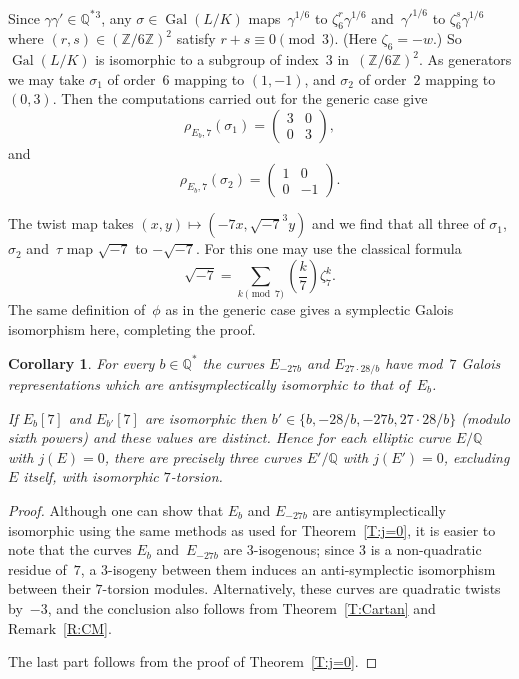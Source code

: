 \documentclass[12pt]{amsart}
\newcommand{\Q}{\mathbb{Q}}
\newcommand{\Z}{\mathbb{Z}}
\DeclareMathOperator{\Gal}{Gal}
\def\legendre#1#2{\left(\displaystyle\frac{#1}{#2}\right)}
\numberwithin{equation}{section}
\newtheorem{corollary}[theorem]{Corollary}
\theoremstyle{definition}
\theoremstyle{remark}
\begin{document}
Since $\gamma\gamma'\in\Q^*{}^3$, any $\sigma\in\Gal(L/K)$
maps~$\gamma^{1/6}$ to $\zeta_6^r\gamma^{1/6}$ and~$\gamma'^{1/6}$ to
$\zeta_6^s\gamma^{1/6}$ where $(r,s)\in(\Z/6\Z)^2$ satisfy
$r+s\equiv0\pmod3$.  (Here $\zeta_6=-w$.) So $\Gal(L/K)$ is isomorphic
to a subgroup of index~$3$ in~$(\Z/6\Z)^2$.  As generators we may take
$\sigma_1$ of order~$6$ mapping to $(1,-1)$, and $\sigma_2$ of
order~$2$ mapping to $(0,3)$.  Then the computations carried out for
the generic case give
\[
   \rho_{E_b,7}(\sigma_1) = \begin{pmatrix}3&0\\0&3   \end{pmatrix},
\]
and
\[
   \rho_{E_b,7}(\sigma_2) = \begin{pmatrix}1&0\\0&-1   \end{pmatrix}.
\]

The twist map takes $(x,y)\mapsto(-7x,\sqrt{-7}^3y)$ and we find that
all three of $\sigma_1$, $\sigma_2$ and~$\tau$ map $\sqrt{-7}$ to
$-\sqrt{-7}$.  For this one may use the classical formula
\[
   \sqrt{-7} = \sum_{k\pmod7}\legendre{k}{7}\zeta_7^k.
\]
The same definition of~$\phi$ as in the generic case gives a
symplectic Galois isomorphism here, completing the proof.

\begin{corollary}
For every $b\in\Q^*$ the curves $E_{-27b}$ and $E_{27\cdot28/b}$ have
mod~$7$ Galois representations which are antisymplectically isomorphic
to that of~$E_b$.

If $E_b[7]$ and $E_{b'}[7]$ are isomorphic then $b'\in\{b,-28/b, -27b,
27\cdot28/b\}$ (modulo sixth powers) and these values are distinct.
Hence for each elliptic curve $E/\Q$ with $j(E)=0$, there are
precisely three curves $E'/\Q$ with $j(E')=0$, excluding $E$ itself,
with isomorphic $7$-torsion.
\end{corollary}
\begin{proof}
Although one can show that $E_b$ and $E_{-27b}$ are antisymplectically
isomorphic using the same methods as used for Theorem~\ref{T:j=0}, it
is easier to note that the curves $E_b$ and~$E_{-27b}$ are
$3$-isogenous; since $3$ is a non-quadratic residue of~$7$, a
$3$-isogeny between them induces an anti-symplectic isomorphism
between their $7$-torsion modules. Alternatively, these curves are
quadratic twists by~$-3$, and the conclusion also follows from
Theorem~\ref{T:Cartan} and Remark~\ref{R:CM}.

The last part follows from the proof of Theorem~\ref{T:j=0}.
\end{proof}
\end{document}
